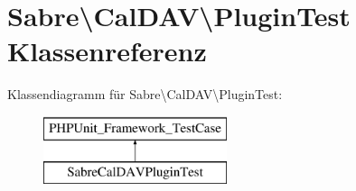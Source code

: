 \hypertarget{class_sabre_1_1_cal_d_a_v_1_1_plugin_test}{}\section{Sabre\textbackslash{}Cal\+D\+AV\textbackslash{}Plugin\+Test Klassenreferenz}
\label{class_sabre_1_1_cal_d_a_v_1_1_plugin_test}
Klassendiagramm für Sabre\textbackslash{}Cal\+D\+AV\textbackslash{}Plugin\+Test\+:\begin{figure}[H]
\begin{center}
\leavevmode
\includegraphics[height=2.000000cm]{class_sabre_1_1_cal_d_a_v_1_1_plugin_test}
\end{center}
\end{figure}
